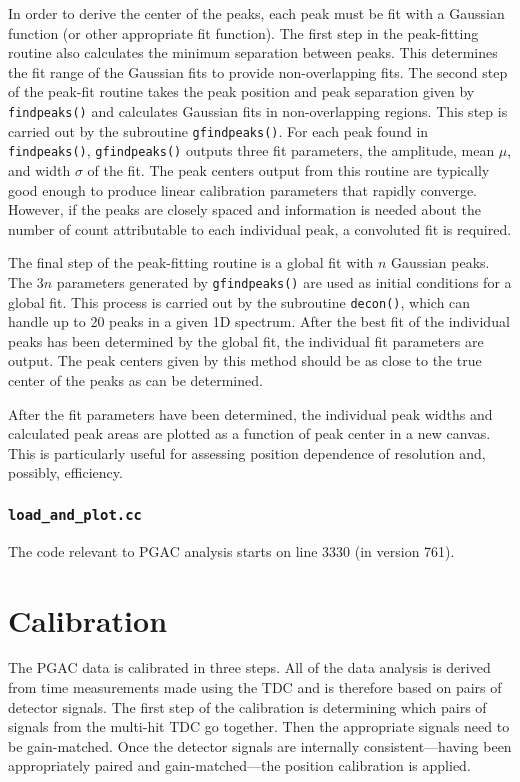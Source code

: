 In order to derive the center of the peaks, each peak must be fit with a Gaussian function (or other appropriate fit function). The first step in the peak-fitting routine also calculates the minimum separation between peaks. This determines the fit range of the Gaussian fits to provide non-overlapping fits. The second step of the peak-fit routine takes the peak position and peak separation given by \texttt{findpeaks()} and calculates Gaussian fits in non-overlapping regions. This step is carried out by the subroutine \texttt{gfindpeaks()}. For each peak found in \texttt{findpeaks()}, \texttt{gfindpeaks()} outputs three fit parameters, the amplitude, mean $\mu$, and width $\sigma$ of the fit. The peak centers output from this routine are typically good enough to produce linear calibration parameters that rapidly converge. However, if the peaks are closely spaced and information is needed about the number of count attributable to each individual peak, a convoluted fit is required.

The final step of the peak-fitting routine is a global fit with $n$ Gaussian peaks. The $3n$ parameters generated by \texttt{gfindpeaks()} are used as initial conditions for a global fit. This process is carried out by the subroutine \texttt{decon()}, which can handle up to 20 peaks in a given 1D spectrum. After the best fit of the individual peaks has been determined by the global fit, the individual fit parameters are output. The peak centers given by this method should be as close to the true center of the peaks as can be determined.

After the fit parameters have been determined, the individual peak widths and calculated peak areas are plotted as a function of peak center in a new canvas. This is particularly useful for assessing position dependence of resolution and, possibly, efficiency.

\subsubsection{\texttt{load\_and\_plot.cc}}
The code relevant to PGAC analysis starts on line 3330 (in version 761).




\section{Calibration}
The PGAC data is calibrated in three steps. All of the data analysis is derived from time measurements made using the TDC and is therefore based on pairs of detector signals. The first step of the calibration is determining which pairs of signals from the multi-hit TDC go together. Then the appropriate signals need to be gain-matched. Once the detector signals are internally consistent---having been appropriately paired and gain-matched---the position calibration is applied.
